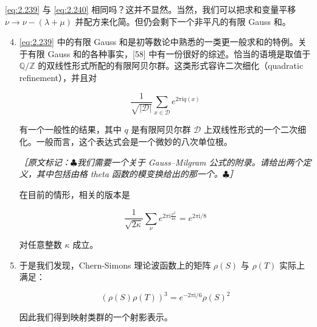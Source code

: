 \eqref{eq:2.239} 与 \eqref{eq:2.240} 相同吗？这并不显然。当然，我们可以把求和变量平移 $\nu\to\nu-(\lambda+\mu)$ 并配方来化简。但仍会剩下一个非平凡的有限 Gauss 和。

\begin{enumerate}
  \setcounter{enumi}{3}
  \item \eqref{eq:2.239} 中的有限 Gauss 和是初等数论中熟悉的一类更一般求和的特例。关于有限 Gauss 和的各种事实，[58] 中有一份很好的综述。恰当的语境是取值于 $\mathbb{Q}/\mathbb{Z}$ 的双线性形式所配的有限阿贝尔群。这类形式容许二次细化（quadratic refinement），并且对

  \begin{equation}
    \frac{1}{\sqrt{|\mathcal{D}|}}\sum_{x\in\mathcal{D}}e^{2\pi\mathrm{i}q(x)}
    \tag{2.241}
    \label{eq:2.241}
  \end{equation}

  有一个一般性的结果，其中 $q$ 是有限阿贝尔群 $\mathcal{D}$ 上双线性形式的一个二次细化。一般而言，这个表达式会是一个微妙的八次单位根。

  {\small\itshape ［原文标记：$\clubsuit$我们需要一个关于 Gauss–Milgram 公式的附录。请给出两个定义，其中包括由格 theta 函数的模变换给出的那一个。$\clubsuit$］}

  在目前的情形，相关的版本是

  \begin{equation}
    \frac{1}{\sqrt{2\kappa}}\sum_\nu e^{2\pi\mathrm{i}\frac{\nu^2}{4\kappa}}=e^{2\pi\mathrm{i}/8}
    \tag{2.242}
    \label{eq:2.242}
  \end{equation}

  对任意整数 $\kappa$ 成立。

  \item 于是我们发现，Chern-Simons 理论波函数上的矩阵 $\rho(S)$ 与 $\rho(T)$ 实际上满足：

  \begin{equation}
    (\rho(S)\rho(T))^3=e^{-2\pi\mathrm{i}/6}\rho(S)^2
    \tag{2.243}
    \label{eq:2.243}
  \end{equation}

  因此我们得到映射类群的一个射影表示。
\end{enumerate}

